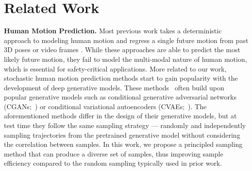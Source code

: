 \documentclass[runningheads]{llncs}
\begin{document}
	
	\vspace{-5mm}
	\section{Related Work}
	\vspace{-2mm}
	\noindent\textbf{Human Motion Prediction.} Most previous work takes a deterministic approach to modeling human motion and regress a single future motion from past 3D poses \cite{fragkiadaki2015recurrent,jain2016structural,butepage2017deep,li2017auto,ghosh2017learning,martinez2017human,pavllo2018quaternet,chiu2019action,gopalakrishnan2019neural,aksan2019structured,wang2019imitation,mao2019learning} or video frames \cite{chao2017forecasting,zhang2019predicting,yuan2019egopose}. While these approaches are able to predict the most likely future motion, they fail to model the multi-modal nature of human motion, which is essential for safety-critical applications. More related to our work, stochastic human motion prediction methods start to gain popularity with the development of deep generative models. These methods~\cite{walker2017pose,lin2018human,barsoum2018hp,ruiz2018human,kundu2019bihmp,yan2018mt,aliakbarian2020stochastic,yuan2020residual} often build upon popular generative models such as conditional generative adversarial networks (CGANs;~\cite{goodfellow2014generative}) or conditional variational autoencoders (CVAEs;~\cite{kingma2013auto}). The aforementioned methods differ in the design of their generative models, but at test time they follow the same sampling strategy --- randomly and independently sampling trajectories from the pretrained generative model without considering the correlation between samples. In this work, we propose a principled sampling method that can produce a diverse set of samples, thus improving sample efficiency compared to the random sampling typically used in prior work.
	
\end{document}
